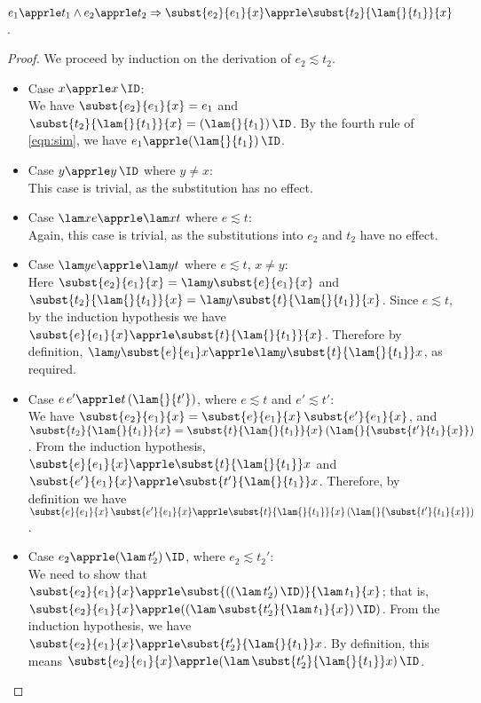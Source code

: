 \begin{lemma}
$e_1 \apprle t_1 \wedge e_2 \apprle t_2 \Rightarrow \subst{e_2}{e_1}{x} \apprle \subst{t_2}{\lam{}{t_1}}{x}$.
\label{lem:subst}
\end{lemma}
\begin{proof}
We proceed by induction on the derivation of $e_2 \apprle t_2$.
\begin{itemize}
\item Case $x \apprle x\,\ID$:\\
We have $\subst{e_2}{e_1}{x} = e_1$ and
$\subst{t_2}{\lam{}{t_1}}{x} = (\lam{}{t_1})\,\ID$.
By the fourth rule of \eqref{eqn:sim},
we have $e_1 \apprle (\lam{}{t_1})\,\ID$.

\item Case $y \apprle y\,\ID$ where $y\neq x$: \\
This case is trivial, as the substitution has no effect.

\item Case $\lam xe \apprle \lam xt$ where $e\apprle t$: \\
Again, this case is trivial, as the substitutions into $e_2$ and $t_2$ have no effect.
\item Case $\lam ye \apprle \lam yt$ where $e\apprle t$, $x\neq y$:\\
Here 
$\subst{e_2}{e_1}{x} = \lam y{\subst{e}{e_1}{x}}$ and
$\subst{t_2}{\lam{}{t_1}}{x} = \lam y{\subst{t}{\lam{}{t_1}}{x}}$.
Since $e\apprle t$, by the induction hypothesis we have
$\subst{e}{e_1}{x} \apprle \subst{t}{\lam{}{t_1}}{x}$.
Therefore by definition, $\lam y{\subst{e}{e_1}x} \apprle \lam
y{\subst{t}{\lam{}{t_1}}x}$, as required.

\item Case $e\,e' \apprle t\,(\lam{}{t'})$, where $e\apprle t$ and $e'\apprle t'$: \\
We have $\subst{e_2}{e_1}{x} = \subst{e}{e_1}{x}\,\subst{e'}{e_1}{x}$,
and $\subst{t_2}{\lam{}{t_1}}{x} =
\subst{t}{\lam{}{t_1}}{x}\,(\lam{}{\subst{t'}{t_1}{x}})$. From the
induction hypothesis, $\subst{e}{e_1}{x} \apprle \subst{t}{\lam{}{t_1}}x$
and $\subst{e'}{e_1}{x} \apprle \subst{t'}{\lam{}{t_1}}x$.
Therefore, by definition we have
$\subst{e}{e_1}{x}\,\subst{e'}{e_1}{x}
\apprle \subst{t}{\lam{}{t_1}}{x}\,(\lam{}{\subst{t'}{t_1}{x}})$.

\item Case $e_2 \apprle (\lam\, t_2')\,\ID$, where $e_2\apprle t_2'$: \\
We need to show that $\subst{e_2}{e_1}{x} \apprle \subst{((\lam\,t_2')\,\ID)}{\lam\,t_1}{x}$; that is,
$\subst{e_2}{e_1}{x} \apprle ((\lam\, \subst{t_2'}{\lam\,t_1}{x})\,\ID)$.
From the induction hypothesis, we have $\subst{e_2}{e_1}{x} \apprle 
\subst{t_2'}{\lam{}{t_1}}x$. By definition, this means
$\subst{e_2}{e_1}{x} \apprle (\lam\,\subst{t_2'}{\lam{}{t_1}}x)\,\ID$.
\end{itemize}
\end{proof}

